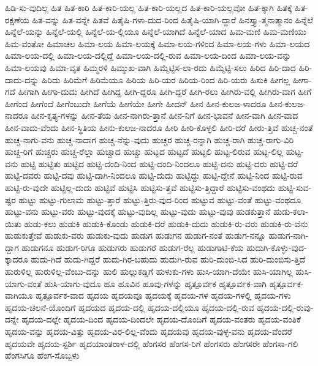 {ಹಿಡಿ-ಸು-ವುದಿಲ್ಲ
ಹಿತ
ಹಿತ-ಕಾರಿ
ಹಿತ-ಕಾರಿ-ಯಲ್ಲ
ಹಿತ-ಕಾರಿ-ಯಲ್ಲದ
ಹಿತ-ಕಾರಿ-ಯಲ್ಲವೋ
ಹಿತ-ಕ್ಕಾಗಿ
ಹಿತಕ್ಕೆ
ಹಿತ-ರಕ್ಷಣೆಯ
ಹಿತ-ವನ್ನು
ಹಿತ-ವನ್ನೇ
ಹಿತವೆ
ಹಿತೈಷಿ-ಗಳಾ-ದುದ-ರಿಂದ
ಹಿತೈಷಿ-ಯಾಗಿ-ದ್ದಾರೆ
ಹಿನಸ್ತ್ಯಾ-ತ್ಮನಾತ್ಮಾನಂ
ಹಿನ್ನೆಲೆ
ಹಿನ್ನೆಲೆ-ಯನ್ನು
ಹಿನ್ನೆಲೆ-ಯಲ್ಲಿ
ಹಿನ್ನೆಲೆ-ಯ-ಲ್ಲಿಯೂ
ಹಿನ್ನೆಲೆ-ಯಾಗಿದೆ
ಹಿನ್ನೆಲೆ-ಯಾದ
ಹಿಮ-ಮಣಿ
ಹಿಮ-ಮಣಿಯು
ಹಿಮ-ವಂತೋ
ಹಿಮಾಚಲ
ಹಿಮಾ-ಲಯ
ಹಿಮಾ-ಲಯಕ್ಕೆ
ಹಿಮಾ-ಲಯ-ಗಳಿಂದ
ಹಿಮಾ-ಲಯ-ಗಳು
ಹಿಮಾ-ಲಯದ
ಹಿಮಾ-ಲಯ-ದಲ್ಲಿ
ಹಿಮಾ-ಲಯ-ದಲ್ಲಿದ್ದೆ
ಹಿಮಾ-ಲಯ-ದಲ್ಲಿ-ರುವ
ಹಿಮಾ-ಲಯ-ದಿಂದ
ಹಿಮಾ-ಲಯ-ವನ್ನು
ಹಿಮಾ-ಲಯವು
ಹಿಮಾ-ವೃತ
ಹಿಮ್ಮರಳಿ
ಹಿಮ್ಮುಖ-ವಾಗಿ
ಹಿಮ್ಮೆಟ್ಟಿಸ-ಲಾ-ರದು
ಹಿಮ್ಮೆಟ್ಟಿ-ಸಲು
ಹಿರಿದ
ಹಿರಿ-ದಾದ
ಹಿರಿ-ದಾದು-ದನ್ನು
ಹಿರಿದು
ಹಿರಿಮೆಗೆ
ಹಿರಿಮೆಯೂ
ಹಿರಿಯ
ಹಿರಿ-ಯರ
ಹಿರಿಯ-ರಿಂದ
ಹಿರಿ-ಯರು
ಹಿಸುಕಿ
ಹೀಗಲ್ಲ
ಹೀಗಾ-ಗದೆ
ಹೀಗಾಗಿ
ಹೀಗಾ-ದುದು
ಹೀಗಿದೆ
ಹೀಗಿದ್ದ
ಹೀಗಿ-ದ್ದರೂ
ಹೀಗಿ-ದ್ದರೆ
ಹೀಗಿ-ರಲು
ಹೀಗಿರು-ವಲ್ಲಿ
ಹೀಗಿರು-ವಾಗ
ಹೀಗೆ
ಹೀಗೆಂದ
ಹೀಗೆಂದೆ
ಹೀಗೆಂಬುದೇ
ಹೀಗೆಯೆ
ಹೀಗೆಯೇ
ಹೀಗೇ
ಹೀದನ್
ಹೀನ
ಹೀನ-ಕುಲಜ-ಳಾದರೂ
ಹೀನ-ಕುಲಜ-ನಾದರೂ
ಹೀನ-ಕೃತ್ಯ-ಗಳನ್ನು
ಹೀನ-ತೆಯ
ಹೀನ-ನಾಗಿರು-ತ್ತಾನೆ
ಹೀನ-ನಿಗೆ
ಹೀನ-ಭಾವನೆ
ಹೀನ-ವಾಗಿ
ಹೀನ-ವಾದ
ಹೀನ-ವಾದು-ವೆಂದು
ಹೀನ-ಸ್ಥಿತಿಯ
ಹೀನು-ಕುಲಜ-ನಾದರೂ
ಹೀರಿ
ಹೀರಿ-ಕೊಳ್ಳಲಿ
ಹೀರಿ-ದರೆ
ಹೀರು-ತ್ತಿವೆ
ಹುಚ್ಚ-ನಂತೆ
ಹುಚ್ಚ-ನಾಗು-ವನು
ಹುಚ್ಚ-ನಾದಾಗ
ಹುಚ್ಚ-ನೆನ್ನು-ವುದು
ಹುಚ್ಚರ
ಹುಚ್ಚ-ರನ್ನಾಗಿ
ಹುಚ್ಚ-ರಾಗಿ
ಹುಚ್ಚ-ರಾಗು-ವಿರಿ
ಹುಚ್ಚ-ರಿಗೆ
ಹುಚ್ಚರು
ಹುಚ್ಚ-ರೆಲ್ಲಾ
ಹುಚ್ಚಾದ
ಹುಚ್ಚು
ಹುಟ್ಟದ
ಹುಟ್ಟದೆ
ಹುಟ್ಟಲಿ
ಹುಟ್ಟ-ಲಿರುವ
ಹುಟ್ಟ-ಲಿಲ್ಲ
ಹುಟ್ಟ-ವನು
ಹುಟ್ಟಿ
ಹುಟ್ಟಿತು
ಹುಟ್ಟಿದ
ಹುಟ್ಟಿ-ದಂದಿ-ನಿಂದ
ಹುಟ್ಟಿ-ದಂದಿ-ನಿಂದಲೂ
ಹುಟ್ಟಿ-ದನು
ಹುಟ್ಟಿ-ದರು
ಹುಟ್ಟಿ-ದರೆ
ಹುಟ್ಟಿ-ದವರು
ಹುಟ್ಟಿ-ದವು
ಹುಟ್ಟಿ-ದಾಗಿ-ನಿಂದಲೂ
ಹುಟ್ಟಿ-ದುದು
ಹುಟ್ಟಿದ್ದು
ಹುಟ್ಟಿ-ದ್ದೇನೆ
ಹುಟ್ಟಿ-ನಿಂದ
ಹುಟ್ಟಿ-ರುವ
ಹುಟ್ಟಿ-ರು-ವುದೇ
ಹುಟ್ಟಿಲ್ಲ-ದುದು
ಹುಟ್ಟಿವೆ
ಹುಟ್ಟಿಸಿ
ಹುಟ್ಟಿಸು-ತ್ತವೆ
ಹುಟ್ಟಿಸು-ತ್ತಿದ್ದಾರೆ
ಹುಟ್ಟಿಸು-ವಂಥದು
ಹುಟ್ಟಿ-ಸುವ-ಷ್ಟರ
ಹುಟ್ಟು
ಹುಟ್ಟು-ಗುಲಾಮ
ಹುಟ್ಟು-ತ್ತಾರೆ
ಹುಟ್ಟು-ತ್ತಿರು-ವುದ-ರಿಂದ
ಹುಟ್ಟುವ
ಹುಟ್ಟು-ವಂತೆ
ಹುಟ್ಟು-ವಂಥದೂ
ಹುಟ್ಟು-ವನು
ಹುಟ್ಟು-ವರು
ಹುಟ್ಟು-ವುದಕ್ಕೆ
ಹುಟ್ಟು-ವುದಿಲ್ಲ
ಹುಟ್ಟು-ವುದು
ಹುಟ್ಟು-ವುವು
ಹುಡಕುತ್ತಾನೆ
ಹುಡು-ಕಲಾ-ಯಿತು
ಹುಡು-ಕಲು
ಹುಡುಕಿ
ಹುಡುಕಿ-ಕೊಂಡು
ಹುಡುಕಿ-ದರೆ
ಹುಡುಕಿ-ದುದು
ಹುಡುಕಿ-ರು-ವರು
ಹುಡುಕಿ-ರು-ವೆನು
ಹುಡುಕುತ್ತೇವೆ
ಹುಡುಕು-ವರು
ಹುಡುಕು-ವುದು
ಹುಡುಗ
ಹುಡುಗನ
ಹುಡುಗ-ನಂತೆ
ಹುಡುಗ-ನನ್ನೂ
ಹುಡುಗ-ನಾಗಿ-ದ್ದಾಗ
ಹುಡುಗನೂ
ಹುಡುಗ-ರಿಗೂ
ಹುಡುಗರು
ಹುಡುಗರೆ
ಹುಡುಗ-ರೆಲ್ಲ
ಹುಡುಗಾಟಿ-ಕೆಯ
ಹುದುಗಿ-ಕೊಳ್ಳು-ವುದ-ಕ್ಕಾದರೂ
ಹುದು-ಗಿದೆ
ಹುದು-ಗಿದ್ದರೆ
ಹುದು-ಗಿರ-ಬಹುದು
ಹುದುಗಿ-ರುವ
ಹುರಿ-ದುಂಬಿ-ಸಿದ
ಹುರಿ-ದುಂಬಿಸು-ತ್ತಿದೆ
ಹುರುಳಿಲ್ಲ
ಹುರುಳಿಲ್ಲ-ವೆಂಬು-ದನ್ನು
ಹುಲಿ
ಹುಲ್ಲುಕಡ್ಡಿಗೆ
ಹುಳುಕು-ಗಳು
ಹುಸಿ-ಯಾಗಿ-ದೆಯೇ
ಹುಸಿ-ಯಾಗಿಲ್ಲ
ಹುಸಿ-ಯಾಗು-ವಂತೆ
ಹುಸಿ-ಯಾಗು-ವುದೂ
ಹೂ
ಹೂವಿನ
ಹೂವು-ಗಳನ್ನು
ಹೃತ್ಪೂರ್ವಕ
ಹೃತ್ಪೂರ್ವಕ-ವಾಗಿ
ಹೃತ್ಪೂರ್ವಕ-ವಾಗಿಯೂ
ಹೃತ್ಪೂರ್ವಕ-ವಾದ
ಹೃದಯ
ಹೃದಯವೂ
ಹೃದಯಕ್ಕೆ
ಹೃದಯ-ಗಳ
ಹೃದಯ-ಗಳಲ್ಲಿ
ಹೃದಯ-ಗಳು
ಹೃದಯ-ಚಲನೆ-ಯೊಂದಿಗೆ
ಹೃದಯದ
ಹೃದಯ-ದಲ್ಲಿ
ಹೃದಯ-ದಲ್ಲಿಯೂ
ಹೃದಯ-ದಲ್ಲಿ-ರುವ
ಹೃದಯ-ದಲ್ಲಿ-ರುವು-ದನ್ನೇ
ಹೃದಯ-ದಲ್ಲೇ
ಹೃದಯ-ದಿಂದ
ಹೃದಯ-ದಿಂದಲೇ
ಹೃದಯ-ದೊಂದಿಗೆ
ಹೃದಯ-ವಂತರು
ಹೃದಯ-ವಂತಿಕೆ
ಹೃದಯ-ವನ್ನು
ಹೃದಯ-ವಿತ್ತು
ಹೃದಯ-ವಿರ-ಲಿಲ್ಲ-ವೆಂದು
ಹೃದಯವು
ಹೃದಯ-ವುಳ್ಳ-ವನು
ಹೃದಯ-ವೆಂದರೆ
ಹೃದಯವೇ
ಹೃದಯ-ಸ್ಪರ್ಶಿ
ಹೃದಯಾಂತರಾಳ-ದಲ್ಲಿ
ಹೆಂಗಸರ
ಹೆಂಗಸ-ರಿಗೆ
ಹೆಂಗಸರು
ಹೆಂಗಸರೇ
ಹೆಂಗಸಾ-ಗಲಿ
ಹೆಂಗಸಿಗೂ
ಹೆಂಗ-ಸೊಬ್ಬಳು
}
